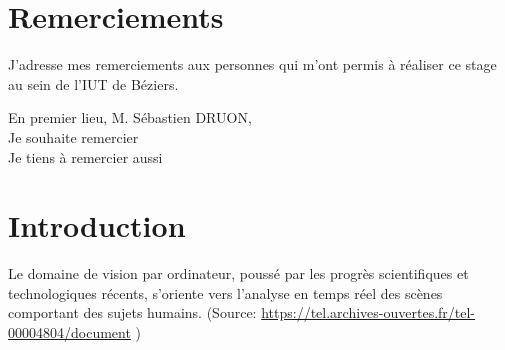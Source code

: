 \documentclass[12pt, french]{report}
\begin{document}
\section*{Remerciements}
J'adresse mes remerciements aux personnes qui m'ont permis à réaliser ce stage au sein de l'IUT de Béziers.

\bigskip

En premier lieu, M. Sébastien DRUON,\\
Je souhaite remercier\\
Je tiens à remercier aussi \\

\newpage


\tableofcontents
\clearpage 


\startcontents[mainsections]%

\section{Introduction}




        Le domaine de vision par ordinateur, poussé par les progrès scientifiques et technologiques récents, s’oriente vers l’analyse en temps réel des scènes comportant des sujets humains. (Source: \url{https://tel.archives-ouvertes.fr/tel-00004804/document} ) %
       
\end{document}
